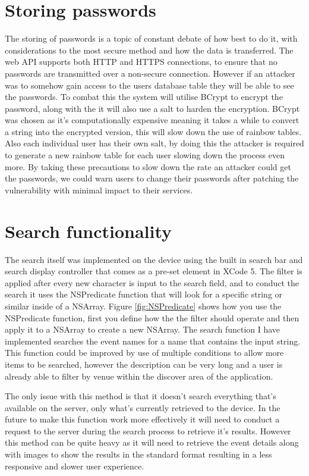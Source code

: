 	\section{Storing passwords}
		The storing of passwords is a topic of constant debate of how best to do it, with considerations to the most secure method and how the data is transferred. The web API supports both HTTP and HTTPS connections, to ensure that no passwords are transmitted over a non-secure connection. However if an attacker was to somehow gain access to the users database table they will be able to see the passwords. To combat this the system will utilise BCrypt to encrypt the password, along with the it will also use a salt to harden the encryption. BCrypt was chosen as it's computationally expensive meaning it takes a while to convert a string into the encrypted version, this will slow down the use of rainbow tables. Also each individual user has their own salt, by doing this the attacker is required to generate a new rainbow table for each user slowing down the process even more. By taking these precautions to slow down the rate an attacker could get the passwords, we could warn users to change their passwords after patching the vulnerability with minimal impact to their services. 

	\section{Search functionality}
		The search itself was implemented on the device using the built in search bar and search display controller that comes as a pre-set element in XCode 5. The filter is applied after every new character is input to the search field, and to conduct the search it uses the NSPredicate function that will look for a specific string or similar inside of a NSArray. Figure \ref{fig:NSPredicate} shows how you use the NSPredicate function, first you  define how the the filter should operate and then apply it to a NSArray to create a new NSArray. The search function I have implemented searches the event names for a name that contains the input string. This function could be improved by use of multiple conditions to allow more items to be searched, however the description can be very long and a user is already able to filter by venue within the discover area of the application.

		The only issue with this method is that it doesn't search everything that's available on the server, only what's currently retrieved to the device. In the future to make this function work more effectively it will need to conduct a request to the server during the search process to retrieve it's results. However this method can be quite heavy as it will need to retrieve the event details along with images to show the results in the standard format resulting in a less responsive and slower user experience. 

